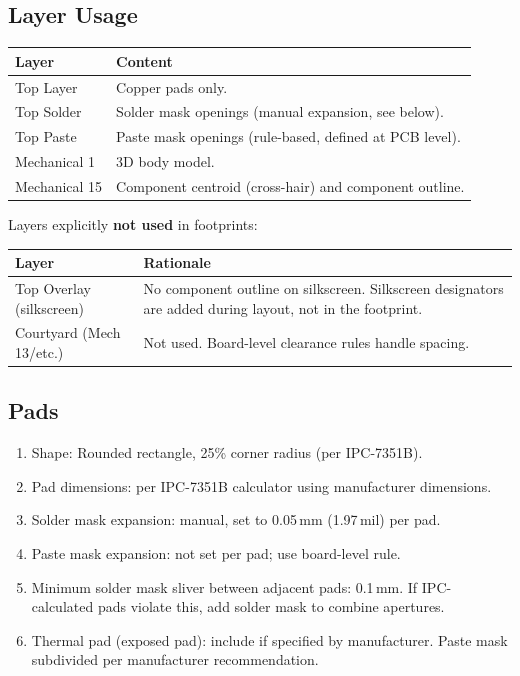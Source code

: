 \documentclass[11pt,a4paper]{article}
\begin{document}
\subsection{Layer Usage}

\begin{tabular}{@{}lL{9cm}@{}}
\toprule
Layer & Content \\
\midrule
Top Layer        & Copper pads only. \\
Top Solder       & Solder mask openings (manual expansion, see below). \\
Top Paste        & Paste mask openings (rule-based, defined at PCB level). \\
Mechanical 1     & 3D body model. \\
Mechanical 15    & Component centroid (cross-hair) and component outline. \\
\bottomrule
\end{tabular}

Layers explicitly \textbf{not used} in footprints:

\begin{tabular}{@{}lL{9cm}@{}}
\toprule
Layer & Rationale \\
\midrule
Top Overlay (silkscreen) & No component outline on silkscreen. Silkscreen designators are added during layout, not in the footprint. \\
Courtyard (Mech 13/etc.) & Not used. Board-level clearance rules handle spacing. \\
\bottomrule
\end{tabular}

\subsection{Pads}

\begin{enumerate}[nosep]
  \item Shape: Rounded rectangle, 25\% corner radius (per IPC-7351B).
  \item Pad dimensions: per IPC-7351B calculator using manufacturer dimensions.
  \item Solder mask expansion: manual, set to 0.05\,mm (1.97\,mil) per pad.
  \item Paste mask expansion: not set per pad; use board-level rule.
  \item Minimum solder mask sliver between adjacent pads: 0.1\,mm. If IPC-calculated pads violate this, add solder mask to combine apertures.
  \item Thermal pad (exposed pad): include if specified by manufacturer. Paste mask subdivided per manufacturer recommendation.
\end{enumerate}
\end{document}
